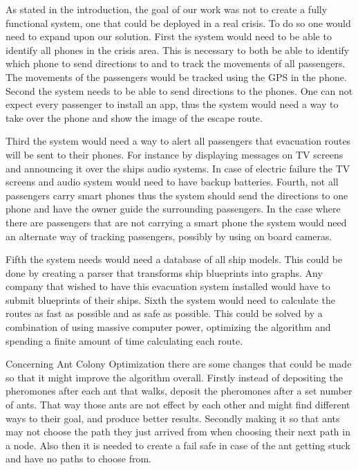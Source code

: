 As stated in the introduction, the goal of our work was not to create a fully functional system, one that could be deployed in a real crisis. To do so one would need to expand upon our solution. First the system would need to be able to identify all phones in the crisis area. This is necessary to both be able to identify which phone to send directions to and to track the movements of all passengers. The movements of the passengers would be tracked using the GPS in the phone. Second the system needs to be able to send directions to the phones. One can not expect every passenger to install an app, thus the system would need a way to take over the phone and show the image of the escape route. 

Third the system would need a way to alert all passengers that evacuation routes will be sent to their phones. For instance by displaying messages on TV screens and announcing it over the ships audio systems. In case of electric failure the TV screens and audio system would need to have backup batteries.  Fourth, not all passengers carry smart phones thus the system should send the directions to one phone and have the owner guide the surrounding passengers. In the case where there are passengers that are not carrying a smart phone the system would need an alternate way of tracking passengers, possibly by using on board cameras.

Fifth the system needs would need a database of all ship models. This could be done by creating a parser that transforms ship blueprints into graphs. Any company that wished to have this evacuation system installed would have to submit blueprints of their ships. Sixth the system would need to calculate the routes as fast as possible and as safe as possible. This could be solved by a combination of using massive computer power, optimizing the algorithm and spending a finite amount of time calculating each route.

Concerning Ant Colony Optimization there are some changes that could be made so that it might improve the algorithm overall. Firstly instead of depositing the pheromones after each ant that walks, deposit the pheromones after a set number of ants. That way those ants are not effect by each other and might find different ways to their goal, and produce better results. Secondly making it so that ants may not choose the path they just arrived from when choosing their next path in a node. Also then it is needed to create a fail safe in case of the ant getting stuck and have no paths to choose from.
